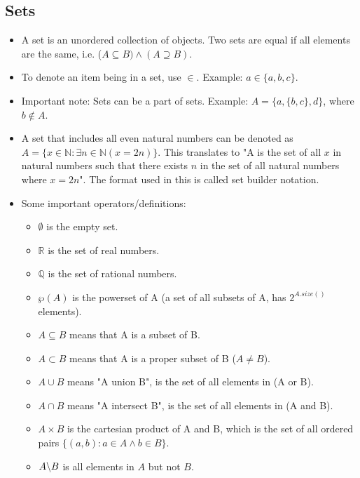 \subsection{Sets}

\begin{itemize}
    \item A set is an unordered collection of objects. Two sets are equal if all elements are the same, i.e. ($A \subseteq B) \wedge (A \supseteq B)$.
    
    \item To denote an item being in a set, use $\in$. Example: $a \in \{a, b, c\}$.
    
    \item Important note: Sets can be a part of sets. Example: $A = \{a, \{b, c\}, d\}$, where $b \notin A$.
    
    \item A set that includes all even natural numbers can be denoted as $A = \{x \in \mathbb{N} : \exists n \in \mathbb{N} (x = 2n) \}$. This translates to "A is the set of all $x$ in natural numbers such that there exists $n$ in the set of all natural numbers where $x = 2n$". The format used in this is called set builder notation.
    
    \item Some important operators/definitions:
        \begin{itemize}
            \item $\emptyset$ is the empty set.
            \item $\mathbb{R}$ is the set of real numbers.
            \item $\mathbb{Q}$ is the set of rational numbers.
            \item $\wp (A)$ is the powerset of A (a set of all subsets of A, has $2^{A.size()}$ elements).
            \item $A \subseteq B$ means that A is a subset of B.
            \item $A \subset B$ means that A is a proper subset of B ($A \ne B$).
            \item $A \cup B$ means "A union B", is the set of all elements in (A or B).
            \item $A \cap B$ means "A intersect B", is the set of all elements in (A and B).
            \item $A \times B$ is the cartesian product of A and B, which is the set of all ordered pairs $\{(a, b) : a \in A \wedge b \in B\}$.
            \item $A \SLASH B$ is all elements in $A$ but not $B$.
        \end{itemize}
\end{itemize}

